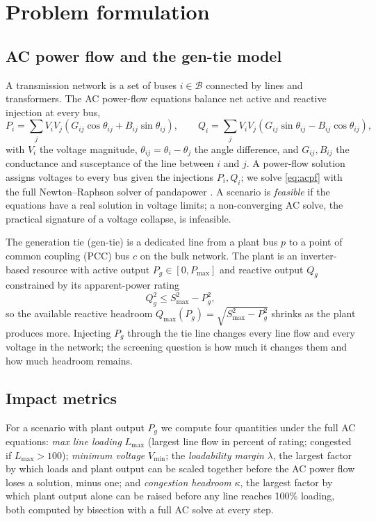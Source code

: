 \documentclass{article}
\newcommand{\citep}[1]{\cite{#1}}
\begin{document}
\section{Problem formulation}

\subsection{AC power flow and the gen-tie model}
A transmission network is a set of buses $i\in\mathcal{B}$ connected by
lines and transformers. The AC power-flow equations balance net active and
reactive injection at every bus,
\begin{equation}
  P_i = \sum_j V_i V_j (G_{ij}\cos\theta_{ij} + B_{ij}\sin\theta_{ij}), \qquad
  Q_i = \sum_j V_i V_j (G_{ij}\sin\theta_{ij} - B_{ij}\cos\theta_{ij}),
  \label{eq:acpf}
\end{equation}
with $V_i$ the voltage magnitude, $\theta_{ij}=\theta_i-\theta_j$ the angle
difference, and $G_{ij},B_{ij}$ the conductance and susceptance of the line
between $i$ and $j$. A power-flow solution assigns voltages to every bus
given the injections $P_i,Q_i$; we solve \eqref{eq:acpf} with the full
Newton--Raphson solver of pandapower \citep{thurner2018pandapower}. A
scenario is \emph{feasible} if the equations have a real solution in
voltage limits; a non-converging AC solve, the practical signature of a
voltage collapse, is infeasible.

The generation tie (gen-tie) is a dedicated line from a plant bus $p$ to a
point of common coupling (PCC) bus $c$ on the bulk network. The plant is an
inverter-based resource with active output $P_g\in[0,P_{\max}]$ and reactive
output $Q_g$ constrained by its apparent-power rating
\begin{equation}
  Q_g^2 \le S_{\max}^2 - P_g^2,
  \label{eq:capability}
\end{equation}
so the available reactive headroom $Q_{\max}(P_g)=\sqrt{S_{\max}^2-P_g^2}$
shrinks as the plant produces more. Injecting $P_g$ through the tie line
changes every line flow and every voltage in the network; the screening
question is how much it changes them and how much headroom remains.

\subsection{Impact metrics}
For a scenario with plant output $P_g$ we compute four quantities under the
full AC equations: \emph{max line loading} $L_{\max}$ (largest line flow in
percent of rating; congested if $L_{\max}>100$); \emph{minimum voltage}
$V_{\min}$; the \emph{loadability margin} $\lambda$, the largest factor by
which loads and plant output can be scaled together before the AC power flow
loses a solution, minus one; and \emph{congestion headroom} $\kappa$, the
largest factor by which plant output alone can be raised before any line
reaches 100\% loading, both computed by bisection with a full AC solve at
every step.
\end{document}
